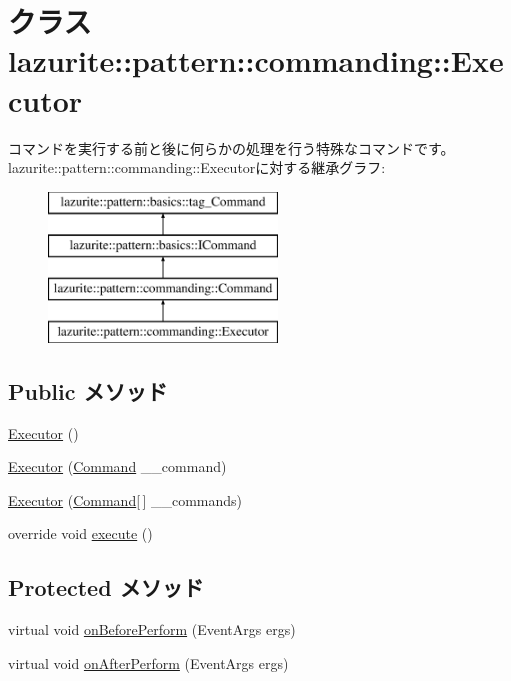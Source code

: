 \hypertarget{classlazurite_1_1pattern_1_1commanding_1_1_executor}{
\section{クラス lazurite::pattern::commanding::Executor}
\label{classlazurite_1_1pattern_1_1commanding_1_1_executor}
}


コマンドを実行する前と後に何らかの処理を行う特殊なコマンドです。  
lazurite::pattern::commanding::Executorに対する継承グラフ:\begin{figure}[H]
\begin{center}
\leavevmode
\includegraphics[height=4cm]{classlazurite_1_1pattern_1_1commanding_1_1_executor}
\end{center}
\end{figure}
\subsection*{Public メソッド}
\begin{DoxyCompactItemize}
\item 
\hyperlink{classlazurite_1_1pattern_1_1commanding_1_1_executor_a996d859c4ffe9f8651a4cc6d52250ba5}{Executor} ()
\item 
\hyperlink{classlazurite_1_1pattern_1_1commanding_1_1_executor_affdea22125a7642892b8b6a47abf6935}{Executor} (\hyperlink{classlazurite_1_1pattern_1_1commanding_1_1_command}{Command} \_\-\_\-command)
\item 
\hyperlink{classlazurite_1_1pattern_1_1commanding_1_1_executor_a185d008652f9e183b58fd28b9d6f316a}{Executor} (\hyperlink{classlazurite_1_1pattern_1_1commanding_1_1_command}{Command}\mbox{[}$\,$\mbox{]} \_\-\_\-commands)
\item 
override void \hyperlink{classlazurite_1_1pattern_1_1commanding_1_1_executor_a984262e0d3834f29ac687904b16e1d34}{execute} ()
\end{DoxyCompactItemize}
\subsection*{Protected メソッド}
\begin{DoxyCompactItemize}
\item 
virtual void \hyperlink{classlazurite_1_1pattern_1_1commanding_1_1_executor_a321dc544512f50dfb30cbfbad9927fca}{onBeforePerform} (EventArgs ergs)
\item 
virtual void \hyperlink{classlazurite_1_1pattern_1_1commanding_1_1_executor_a1dd58f27ce048634b9fa28c1226c045c}{onAfterPerform} (EventArgs ergs)
\end{DoxyCompactItemize}
